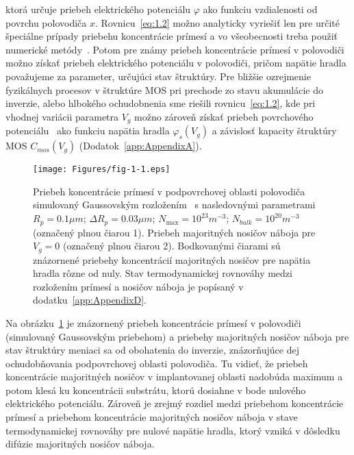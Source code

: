 ktorá určuje priebeh elektrického potenciálu $\varphi$ ako funkciu
vzdialenosti od povrchu polovodiča $x$. Rovnicu~\ref{eq:1.2} možno
analyticky vyriešiť len pre určité špeciálne prípady priebehu
koncentrácie prímesí a vo všeobecnosti treba použiť numerické
metódy~\cite{1.9,1.10}. Potom pre známy priebeh koncentrácie prímesí v
polovodiči možno získať priebeh elektrického potenciálu v polovodiči,
pričom napätie hradla považujeme za parameter, určujúci stav
štruktúry. Pre bližšie ozrejmenie fyzikálnych procesov v štruktúre MOS
pri prechode zo stavu akumulácie do inverzie, alebo hlbokého
ochudobnenia sme riešili rovnicu~\ref{eq:1.2}, kde pri vhodnej
variácii parametra $V_g$ možno zároveň získať priebeh povrchového
potenciálu~ ako funkciu napätia hradla
$\varphi_{s}(V_g)$ a závislosť kapacity štruktúry MOS $C_{mos}(V_g)$
(Dodatok~\ref{app:AppendixA}).

\begin{figure}[h!]\centering
  \texttt{[image: Figures/fig-1-1.eps]}%
  \caption[Priebeh koncentrácie prímesí v podpovrchovej oblasti
    polovodiča]{Priebeh koncentrácie prímesí v podpovrchovej oblasti
    polovodiča simulovaný Gaussovským rozložením~\cite{1.11} s
    nasledovnými parametrami $R_p=0.1 \mu{m}$; $\Delta{R_p}=0.03
    \mu{m}$; $N_{\max}=10^{23} m^{-3}$; $N_{bulk}=10^{20} m^{-3}$
    (označený plnou čiarou 1). Priebeh majoritných nosičov náboja pre
    $V_g=0$ (označený plnou čiarou 2). Bodkovanými čiarami sú
    znázornené priebehy koncentrácií majoritných nosičov pre napätia
    hradla rôzne od nuly. Stav termodynamickej rovnováhy medzi
    rozložením prímesí a nosičov náboja je popísaný v
    dodatku~\ref{app:AppendixD}.}\label{fig:1.1}
\end{figure}

\par Na obrázku~\ref{fig:1.1} je znázornený priebeh koncentrácie
prímesí v polovodiči (simulovaný Gaussovským priebehom) a priebehy
majoritných nosičov náboja pre stav štruktúry meniaci sa od obohatenia
do inverzie, znázorňujúce dej ochudobňovania podpovrchovej oblasti
polovodiča. Tu vidieť, že priebeh koncentrácie majoritných nosičov v
implantovanej oblasti nadobúda maximum a potom klesá ku koncentrácii
substrátu, ktorú dosiahne v bode nulového elektrického potenciálu.
Zároveň je zrejmý rozdiel medzi priebehom koncentrácie prímesí a
priebehom koncentrácie majoritných nosičov náboja v stave
termodynamickej rovnováhy pre nulové napätie hradla, ktorý vzniká v
dôsledku difúzie majoritných nosičov náboja.

